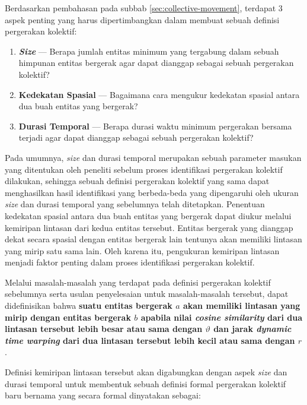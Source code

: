 Berdasarkan pembahasan pada subbab \ref{sec:collective-movement}, terdapat 3 aspek penting yang harus dipertimbangkan dalam membuat sebuah definisi pergerakan kolektif:

\begin{enumerate}
    \item \textbf{\textit{Size}} --- Berapa jumlah entitas minimum yang tergabung dalam sebuah himpunan entitas bergerak agar dapat dianggap sebagai sebuah pergerakan kolektif?
    \item \textbf{Kedekatan Spasial} --- Bagaimana cara mengukur kedekatan spasial antara dua buah entitas yang bergerak?
    \item \textbf{Durasi Temporal} --- Berapa durasi waktu minimum pergerakan bersama terjadi agar dapat dianggap sebagai sebuah pergerakan kolektif?
\end{enumerate}

Pada umumnya, \textit{size} dan durasi temporal merupakan sebuah parameter masukan yang ditentukan oleh peneliti sebelum proses identifikasi pergerakan kolektif dilakukan, sehingga sebuah definisi pergerakan kolektif yang sama dapat menghasilkan hasil identifikasi yang berbeda-beda yang dipengaruhi oleh ukuran \textit{size} dan durasi temporal yang sebelumnya telah ditetapkan. Penentuan kedekatan spasial antara dua buah entitas yang bergerak dapat diukur melalui kemiripan lintasan dari kedua entitas tersebut. Entitas bergerak yang dianggap dekat secara spasial dengan entitas bergerak lain tentunya akan memiliki lintasan yang mirip satu sama lain. Oleh karena itu, pengukuran kemiripan lintasan menjadi faktor penting dalam proses identifikasi pergerakan kolektif.

Melalui masalah-masalah yang terdapat pada definisi pergerakan kolektif sebelumnya serta usulan penyelesaian untuk masalah-masalah tersebut, dapat didefinisikan bahwa \textbf{suatu entitas bergerak $a$ akan memiliki lintasan yang mirip dengan entitas bergerak $b$ apabila nilai \textit{cosine similarity} dari dua lintasan tersebut lebih besar atau sama dengan $\vartheta$ dan jarak \textit{dynamic time warping} dari dua lintasan tersebut lebih kecil atau sama dengan $r$}.

Definisi kemiripan lintasan tersebut akan digabungkan dengan aspek \textit{size} dan durasi temporal untuk membentuk sebuah definisi formal pergerakan kolektif baru bernama \pergerakankolektif yang secara formal dinyatakan sebagai:


